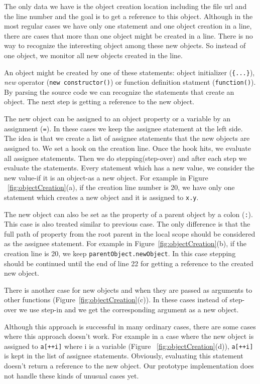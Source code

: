 \documentclass[runningheads,a4paper]{llncs}
\begin{document}
The only data we have is the object creation location including the
file url and the line number and the goal is to get a reference to
this object. Although in the most regular cases we have only one
statement and one object creation in a line, there are cases that more
than one object might be created in a line. There is no way to
recognize the interesting object among these new objects. So instead
of one object, we monitor all new objects created in the line.

An object might be created by one of these statements: object
initializer (\texttt{\{...\}}), \textit{new} operator (\texttt{new 
constructor()}) or function definition statment (\texttt{function()}). 
By parsing the source code we can recognize the statements that
create an object. The next step is getting a reference to the new object.

The new object can be assigned to an object property or a variable by
an assignment (\texttt{=}). In these cases we keep the assignee statement 
at the left side. The idea is that we create a list of assignee statements 
that the new objects are assigned to. We set a hook on the creation
line. Once the hook hits, we evaluate all assignee statements. Then 
we do stepping(step-over) and after each step we evaluate the
statements. Every statement which has a new value, we consider the new
value-if it is an object-as a new object. For example in Figure
~\ref{fig:objectCreation}(a), if the creation line number is 20, we
have only one statement which creates a new object and it is assigned
to \texttt{x.y}.


The new object can also be set as the property of a parent object by a
colon (\texttt{:}). This case is also treated similar to previous case. The
only difference is that the full path of property from the root parent
in the local scope should be considered as the assignee statement. For
example in Figure~\ref{fig:objectCreation}(b), if the creation line
is 20, we keep \texttt{parentObject.newObject}. In this case stepping
should be continued until the end of line 22 for getting a reference
to the created new object.

There is another case for new objects and when they are passed as
arguments to other functions (Figure~\ref{fig:objectCreation}(c)). In these
cases instead of step-over we use step-in and we get the corresponding
argument as a new object.

Although this approach is successful in many ordinary cases, there are some 
cases where this approach doesn't work. For example in a case
where the new object is assigned to \texttt{a[++i]} where i is a variable
(Figure ~\ref{fig:objectCreation}(d)), \texttt{a[++i]} is kept in the list
of assignee statements. Obviously, evaluating this statement doesn't return
a reference to the new object. Our prototype implementation does not handle these kinds of unusual cases yet.
\end{document}
